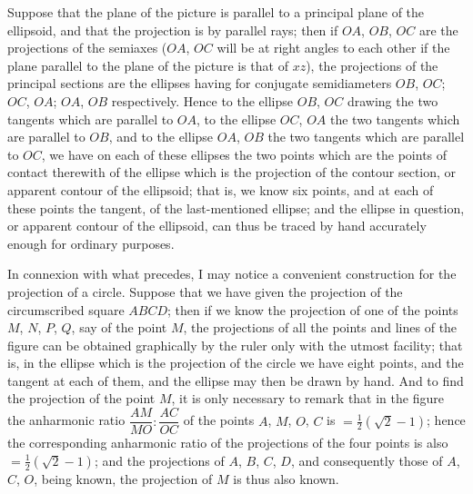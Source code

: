 \documentclass[11pt]{article}
\begin{document}
Suppose that the plane of the picture is parallel to a principal plane of the ellipsoid, and that the projection is by parallel rays; then if $OA$, $OB$, $OC$ are the projections of the semiaxes ($OA$, $OC$ will be at right angles to each other if the plane parallel to the plane of the picture is that of $xz$), the projections of the principal sections are the ellipses having for conjugate semidiameters $OB$, $OC$; $OC$, $OA$; $OA$, $OB$ respectively. Hence to the ellipse $OB$, $OC$ drawing the two tangents which are parallel to $OA$, to the ellipse $OC$, $OA$ the two tangents which are parallel to $OB$, and to the ellipse $OA$, $OB$ the two tangents which are parallel to $OC$, we have on each of these ellipses the two points which are the points of contact therewith of the ellipse which is the projection of the contour section, or apparent contour of the ellipsoid; that is, we know six points, and at each of these points the tangent, of the last-mentioned ellipse; and the ellipse in question, or apparent contour of the ellipsoid, can thus be traced by hand accurately enough for ordinary purposes.

In connexion with what precedes, I may notice a convenient construction for the projection of a circle. Suppose that we have given the projection of the circumscribed square $ABCD$; then if we know the projection of one of the points $M$, $N$, $P$, $Q$, say of the point $M$, the projections of all the points and lines of the figure can be obtained graphically by the ruler only with the utmost facility; that is, in the ellipse which is the projection of the circle we have eight points, and the tangent at each of them, and the ellipse may then be drawn by hand. And to find the projection of the point $M$, it is only necessary to remark that in the figure the anharmonic ratio $\dfrac{AM}{MO} : \dfrac{AC}{OC}$ of the points $A$, $M$, $O$, $C$ is $=\tfrac{1}{2}(\sqrt{2}-1)$; hence the corresponding anharmonic ratio of the projections of the four points is also $=\tfrac{1}{2}(\sqrt{2}-1)$; and the projections of $A$, $B$, $C$, $D$, and consequently those of $A$, $C$, $O$, being known, the projection of $M$ is thus also known.

\medskip
\begin{center}
\end{center}
\end{document}
